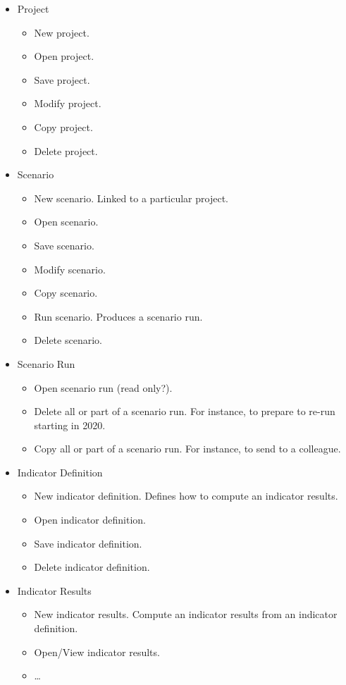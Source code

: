 \documentclass[titlepage]{article}
\begin{document}
\begin{itemize}
  \item Project
  \begin{itemize}
	  \item New project.
	  \item Open project.
	  \item Save project.
	  \item Modify project.
	  \item Copy project.
	  \item Delete project.
	\end{itemize}
	
  \item Scenario 
  \begin{itemize}
	  \item New scenario.  Linked to a particular project.
	  \item Open scenario.
	  \item Save scenario.
	  \item Modify scenario.
	  \item Copy scenario.
	  \item Run scenario.  Produces a scenario run.
	  \item Delete scenario.
	\end{itemize}
	
  \item Scenario Run 
  \begin{itemize}
	  \item Open scenario run (read only?).
	  \item Delete all or part of a scenario run.  For instance, to prepare to re-run starting in 2020.
	  \item Copy all or part of a scenario run.  For instance, to send to a colleague.
	\end{itemize}
	
  \item Indicator Definition 
  \begin{itemize}
	  \item New indicator definition.  Defines how to compute an indicator results.
	  \item Open indicator definition.
	  \item Save indicator definition.
	  \item Delete indicator definition.
	\end{itemize}
	
  \item Indicator Results 
  \begin{itemize}
	  \item New indicator results.  Compute an indicator results from an indicator definition.
	  \item Open/View indicator results.
	  \item \ldots
	\end{itemize}
	

\end{itemize}
\end{document}
